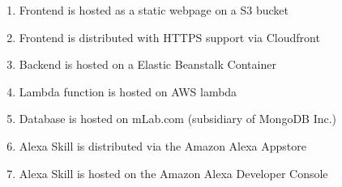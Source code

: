 \begin{enumerate}
	\item Frontend is hosted as a static webpage on a S3 bucket
	\item Frontend is distributed with HTTPS support via Cloudfront
	\item Backend is hosted on a Elastic Beanstalk Container
	\item Lambda function is hosted on AWS lambda
	\item Database is hosted on mLab.com (subsidiary of MongoDB Inc.)
	\item Alexa Skill is distributed via the Amazon Alexa Appstore 
	\item Alexa Skill is hosted on the Amazon Alexa Developer Console
\end{enumerate}



\autocite{hardt_oauth_2012}